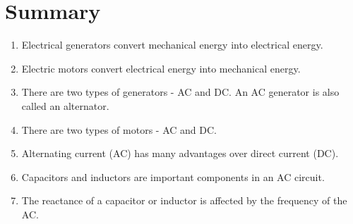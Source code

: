 \section {Summary}
\begin{enumerate}
\item Electrical generators convert mechanical energy into electrical energy.
\item Electric motors convert electrical energy into mechanical energy.
\item There are two types of generators - AC and DC. An AC generator is also called an alternator.
\item There are two types of motors - AC and DC.
\item Alternating current (AC) has many advantages over direct current (DC).
\item Capacitors and inductors are important components in an AC circuit.
\item The reactance of a capacitor or inductor is affected by the frequency of the AC.
\end{enumerate}

